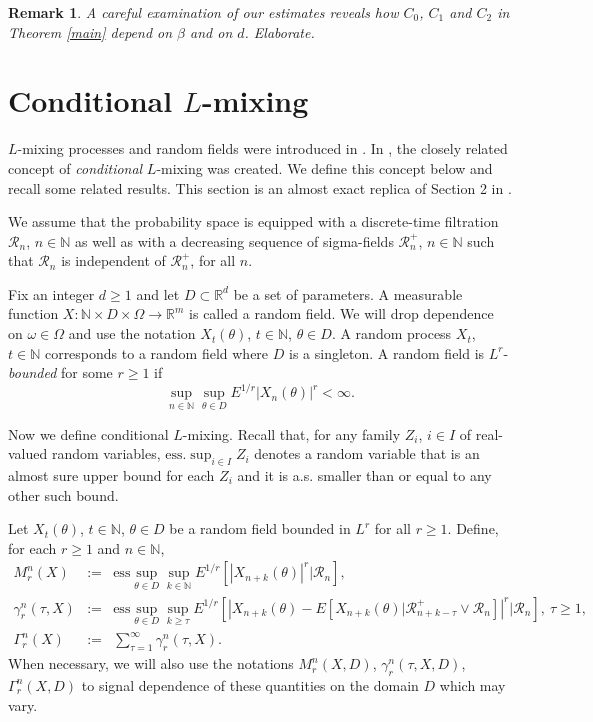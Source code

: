 \documentclass[a4paper,draft]{article}
\newtheorem{remark}[theorem]{Remark}
\begin{document}
\begin{remark}\label{betad} {\rm A careful examination of our estimates reveals how $C_0$, $C_1$
and $C_2$ in Theorem \ref{main} depend on $\beta$ and on $d$. Elaborate.}
\end{remark}


\section{Conditional $L$-mixing}\label{lm}

$L$-mixing processes and random fields
were introduced in \cite{laci1}. In
\cite{4}, the closely related concept of \emph{conditional} $L$-mixing
was created. We
define this concept below and recall some related results.
This section is an almost
exact replica of Section 2 in \cite{convex}.

We assume that the probability space is equipped
with a discrete-time filtration $\mathcal{R}_n$, $n\in\mathbb{N}$ as well as with a decreasing sequence of sigma-fields $\mathcal{R}_n^+$, $n\in\mathbb{N}$ such that $\mathcal{R}_n$ is
independent of $\mathcal{R}_n^+$, for all $n$.

Fix an integer $d\geq 1$ and let $D\subset \mathbb{R}^d$ be a set of parameters. A measurable function
$X:\mathbb{N}\times D\times\Omega\to\mathbb{R}^m$ is called a random field. We will drop dependence on $\omega\in\Omega$ and
use the notation $X_t(\theta)$, $t\in\mathbb{N}$, $\theta\in D$. A random
process $X_t$, $t\in\mathbb{N}$ corresponds to a random field where $D$
is a singleton. A random field is $L^r$-\emph{bounded} for some $r\geq 1$
if
$$
\sup_{n\in\mathbb{N}}\sup_{\theta\in D} E^{1/r}|X_n(\theta)|^r<\infty.
$$

Now we define conditional $L$-mixing.
Recall that, for any family $Z_i$, $i\in I$ of real-valued random variables, $\mathrm{ess.}\sup_{i\in I} Z_i$
denotes a random variable that is an almost sure upper bound for each $Z_i$ and it is a.s.
smaller than or equal to any other such bound.


Let $X_t(\theta)$, $t\in\mathbb{N}$, $\theta\in D$ be a random field
bounded in $L^r$ for all $r\geq 1$.
Define, for each $r\geq 1$ and $n\in\mathbb{N}$,
\begin{eqnarray*}
	M^{n}_r(X) &:=& \mathrm{ess}\sup_{\theta\in D}\sup_{k \in\mathbb{N}}
	E^{1/r}[|X_{n+k}(\theta)|^r\big\vert\mathcal{R}_n],\\
	\gamma^{n}_r(\tau,X)&:=& \mathrm{ess}\sup_{\theta\in D}\sup_{k\geq\tau}
	E^{1/r}[|X_{n+k}(\theta)-E[X_{n+k}(\theta)\vert \mathcal{R}_{n+k-\tau}^+\vee \mathcal{R}_n]|^r\big\vert
	\mathcal{R}_n],\ \tau\geq 1,\\
	\Gamma^{n}_r(X) &:=&\sum_{\tau= 1}^{\infty}\gamma^{n}_r(\tau,X).
\end{eqnarray*}
When necessary, we will also use the notations $M^{n}_r(X,D)$,
$\gamma^{n}_r(\tau,X,D)$, $\Gamma^{n}_r(X,D)$ to signal dependence of
these quantities on the domain $D$ which may vary.
\end{document}
